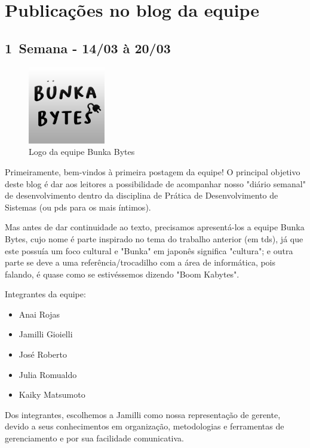 \chapter{Publicações no blog da equipe}
\label{postsBlog}

\section{1\textordfeminine \, Semana - 14/03 à 20/03}

\begin{figure}[htb]
\centering
\caption{Logo da equipe Bunka Bytes}
\includegraphics[width=0.3\textwidth]{anexos/Imagens_Blog/LogoBunkaPDS.png}
\end{figure}
\FloatBarrier

Primeiramente, bem-vindos à primeira postagem da equipe! O principal objetivo deste blog é dar aos leitores a possibilidade de acompanhar nosso "diário semanal" de desenvolvimento dentro da disciplina de Prática de Desenvolvimento de Sistemas (ou \acs{pds} para os mais íntimos).

Mas antes de dar continuidade ao texto, precisamos apresentá-los a equipe Bunka Bytes, cujo nome é parte inspirado no tema do trabalho anterior (em \acs{tds}), já que este possuía um foco cultural e "Bunka" em japonês significa "cultura"; e outra parte se deve a uma referência/trocadilho com a área de informática, pois falando, é quase como se estivéssemos dizendo "Boom Kabytes". 

Integrantes da equipe:

\begin{itemize}
    \item Anai Rojas
    \item Jamilli Gioielli
    \item José Roberto
    \item Julia Romualdo
    \item Kaiky Matsumoto
\end{itemize}

Dos integrantes, escolhemos a Jamilli como nossa representação de gerente, devido a seus conhecimentos em organização, metodologias e ferramentas de gerenciamento e por sua facilidade comunicativa. 

